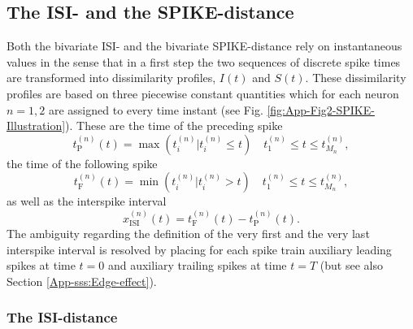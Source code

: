 \documentclass[10pt,twocolumn]{elsart5p}
\begin{document}
\begin{appendix}


\subsection{\label{App-ss:ISI-SPIKE-Distance} The ISI- and the SPIKE-distance}

Both the bivariate ISI- and the bivariate SPIKE-distance rely on instantaneous values in the sense that in a first step the two sequences of discrete spike times are transformed into dissimilarity profiles, $I (t)$ and $S (t)$. These dissimilarity profiles are based on three piecewise constant quantities which for each neuron $n = 1, 2$ are assigned to every time instant (see Fig. \ref{fig:App-Fig2-SPIKE-Illustration}). These are the time of the preceding spike
%
\begin{equation} \label{eq:Prev-Spike}
    t_{\mathrm {P}}^{(n)} (t) = \max(t_i^{(n)} | t_i^{(n)} \leq t)  \quad t_1^{(n)} \leq t \leq t_{M_n}^{(n)},
\end{equation}
%
the time of the following spike
%
\begin{equation} \label{eq:Foll-Spike}
    t_{\mathrm {F}}^{(n)} (t) = \min(t_i^{(n)} | t_i^{(n)} > t)  \quad t_1^{(n)} \leq t \leq t_{M_n}^{(n)},
\end{equation}
%
as well as the interspike interval
%
\begin{equation} \label{eq:ISI}
    x_{\mathrm {ISI}}^{(n)} (t) = t_{\mathrm {F}}^{(n)} (t) - t_{\mathrm {P}}^{(n)} (t).
\end{equation}
%
The ambiguity regarding the definition of the very first and the very last interspike interval is resolved by placing for each spike train auxiliary leading spikes at time $t = 0$ and auxiliary trailing spikes at time $t = T$ (but see also Section \ref{App-sss:Edge-effect}).


\subsubsection{\label{App-sss:ISI-Distance} The ISI-distance}


\end{appendix}
\end{document}
